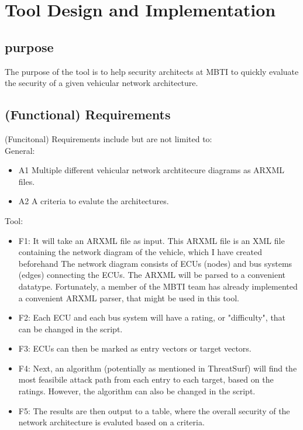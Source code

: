 \chapter{Tool Design and Implementation}
\label{chp:tool}

\section{purpose}\label{sec:purpose}

The purpose of the tool is to help security architects at MBTI to quickly evaluate 
the security of a given vehicular network architecture.

\section{(Functional) Requirements}\label{sec:funct-req}

(Funcitonal) Requirements include but are not limited to:\\

General:

\begin{itemize}
	\item A1\label{sec:a1} Multiple different vehicular network archtitecure diagrams as ARXML files.
	\item A2\label{sec:a2} A criteria to evalute the architectures.
\end{itemize}

Tool:

\begin{itemize}

	\item F1\label{sec:f1}: It will take an ARXML file as input. 
		This ARXML file is an XML file containing the network diagram of the vehicle, which I have created beforehand
		The network diagram consists of ECUs (nodes) and bus systems (edges) connecting the ECUs.
		The ARXML will be parsed to a convenient datatype.
		Fortunately, a member of the MBTI team has already implemented a convenient ARXML parser, that might be used in this tool.

\item F2\label{sec:f2}: Each ECU and each bus system will have a rating, or "difficulty", that can be changed in the script.
\item F3\label{sec:f3}: ECUs can then be marked as entry vectors or target vectors.

\item F4\label{sec:f4}: Next, an algorithm (potentially as mentioned in ThreatSurf\cite{threat_surf}) will find the most feasibile attack path from each entry to each target, 
		based on the ratings.
		However, the algorithm can also be changed in the script.

\item F5\label{sec:f5}: The results are then output to a table, 
		where the overall security of the network architecture is evaluted based on a criteria.

\end{itemize}

